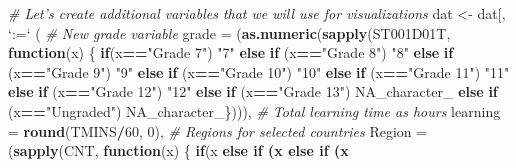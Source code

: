 \documentclass[]{book}
\newenvironment{Shaded}{\begin{snugshade}}{\end{snugshade}}
\newcommand{\CommentTok}[1]{\textcolor[rgb]{0.56,0.35,0.01}{\textit{#1}}}
\newcommand{\ControlFlowTok}[1]{\textcolor[rgb]{0.13,0.29,0.53}{\textbf{#1}}}
\newcommand{\DataTypeTok}[1]{\textcolor[rgb]{0.13,0.29,0.53}{#1}}
\newcommand{\DecValTok}[1]{\textcolor[rgb]{0.00,0.00,0.81}{#1}}
\newcommand{\KeywordTok}[1]{\textcolor[rgb]{0.13,0.29,0.53}{\textbf{#1}}}
\newcommand{\NormalTok}[1]{#1}
\newcommand{\OperatorTok}[1]{\textcolor[rgb]{0.81,0.36,0.00}{\textbf{#1}}}
\newcommand{\OtherTok}[1]{\textcolor[rgb]{0.56,0.35,0.01}{#1}}
\newcommand{\StringTok}[1]{\textcolor[rgb]{0.31,0.60,0.02}{#1}}
\begin{document}
\begin{Shaded}
\begin{Highlighting}[]
\CommentTok{# Let's create additional variables that we will use for visualizations}
\NormalTok{dat <-}\StringTok{ }\NormalTok{dat[, }\StringTok{`}\DataTypeTok{:=}\StringTok{`}\NormalTok{ (}
  \CommentTok{# New grade variable}
  \DataTypeTok{grade =}\NormalTok{ (}\KeywordTok{as.numeric}\NormalTok{(}\KeywordTok{sapply}\NormalTok{(ST001D01T, }\ControlFlowTok{function}\NormalTok{(x) \{}
  \ControlFlowTok{if}\NormalTok{(x}\OperatorTok{==}\StringTok{"Grade 7"}\NormalTok{) }\StringTok{"7"}
  \ControlFlowTok{else} \ControlFlowTok{if}\NormalTok{ (x}\OperatorTok{==}\StringTok{"Grade 8"}\NormalTok{) }\StringTok{"8"}
  \ControlFlowTok{else} \ControlFlowTok{if}\NormalTok{ (x}\OperatorTok{==}\StringTok{"Grade 9"}\NormalTok{) }\StringTok{"9"}
  \ControlFlowTok{else} \ControlFlowTok{if}\NormalTok{ (x}\OperatorTok{==}\StringTok{"Grade 10"}\NormalTok{) }\StringTok{"10"}
  \ControlFlowTok{else} \ControlFlowTok{if}\NormalTok{ (x}\OperatorTok{==}\StringTok{"Grade 11"}\NormalTok{) }\StringTok{"11"}
  \ControlFlowTok{else} \ControlFlowTok{if}\NormalTok{ (x}\OperatorTok{==}\StringTok{"Grade 12"}\NormalTok{) }\StringTok{"12"}
  \ControlFlowTok{else} \ControlFlowTok{if}\NormalTok{ (x}\OperatorTok{==}\StringTok{"Grade 13"}\NormalTok{) }\OtherTok{NA_character_}
  \ControlFlowTok{else} \ControlFlowTok{if}\NormalTok{ (x}\OperatorTok{==}\StringTok{"Ungraded"}\NormalTok{) }\OtherTok{NA_character_}\NormalTok{\}))),}
  \CommentTok{# Total learning time as hours}
  \DataTypeTok{learning =} \KeywordTok{round}\NormalTok{(TMINS}\OperatorTok{/}\DecValTok{60}\NormalTok{, }\DecValTok{0}\NormalTok{),}
  \CommentTok{# Regions for selected countries}
  \DataTypeTok{Region =}\NormalTok{ (}\KeywordTok{sapply}\NormalTok{(CNT, }\ControlFlowTok{function}\NormalTok{(x) \{}
  \ControlFlowTok{if}\NormalTok{(x }\OperatorTok{%
    \ControlFlowTok{else} \ControlFlowTok{if}\NormalTok{ (x }\OperatorTok{%
    \ControlFlowTok{else} \ControlFlowTok{if}\NormalTok{ (x }\OperatorTok{%
}}}
\end{Highlighting}
\end{Shaded}
\end{document}
